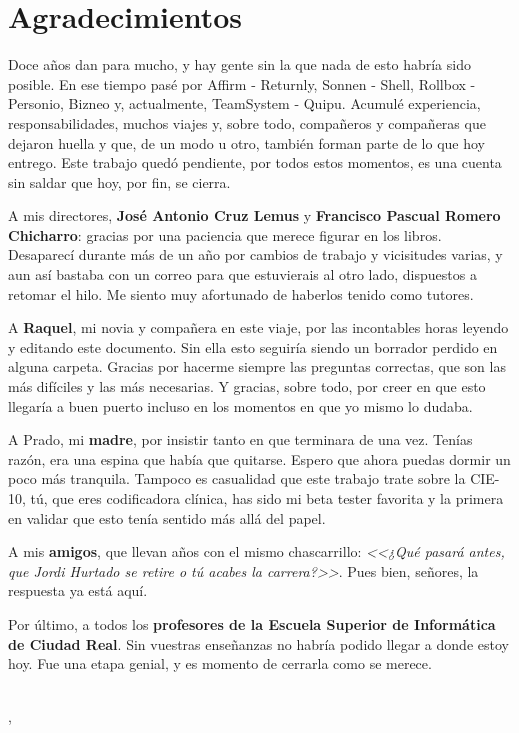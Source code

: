 \ifspanish
\else
\fi


%
%
\chapter*{Agradecimientos} %

Doce años dan para mucho, y hay gente sin la que nada de esto habría sido posible. En ese tiempo pasé por Affirm - Returnly, Sonnen - Shell, Rollbox - Personio, Bizneo y, actualmente, TeamSystem - Quipu. Acumulé experiencia, responsabilidades, muchos viajes y, sobre todo, compañeros y compañeras que dejaron huella y que, de un modo u otro, también forman parte de lo que hoy entrego. Este trabajo quedó pendiente, por todos estos momentos, es una cuenta sin saldar que hoy, por fin, se cierra.

A mis directores, \textbf{José Antonio Cruz Lemus} y \textbf{Francisco Pascual Romero Chicharro}: gracias por una paciencia que merece figurar en los libros. Desaparecí durante más de un año por cambios de trabajo y vicisitudes varias, y aun así bastaba con un correo para que estuvierais al otro lado, dispuestos a retomar el hilo. Me siento muy afortunado de haberlos tenido como tutores.

A \textbf{Raquel}, mi novia y compañera en este viaje, por las incontables horas leyendo y editando este documento. Sin ella esto seguiría siendo un borrador perdido en alguna carpeta. Gracias por hacerme siempre las preguntas correctas, que son las más difíciles y las más necesarias. Y gracias, sobre todo, por creer en que esto llegaría a buen puerto incluso en los momentos en que yo mismo lo dudaba.

A Prado, mi \textbf{madre}, por insistir tanto en que terminara de una vez. Tenías razón, era una espina que había que quitarse. Espero que ahora puedas dormir un poco más tranquila. Tampoco es casualidad que este trabajo trate sobre la CIE-10, tú, que eres codificadora clínica, has sido mi beta tester favorita y la primera en validar que esto tenía sentido más allá del papel.

A mis \textbf{amigos}, que llevan años con el mismo chascarrillo: \emph{<<¿Qué pasará antes, que Jordi Hurtado se retire o tú acabes la carrera?>>}. Pues bien, señores, la respuesta ya está aquí.

Por último, a todos los \textbf{profesores de la Escuela Superior de Informática de Ciudad Real}. Sin vuestras enseñanzas no habría podido llegar a donde estoy hoy. Fue una etapa genial, y es momento de cerrarla como se merece.

\makeatletter
\begin{flushright}
	\vspace{1.5cm}
	\textit{\@autor}\\
	\@cityTF, \@yearTF
\end{flushright}
\makeatother